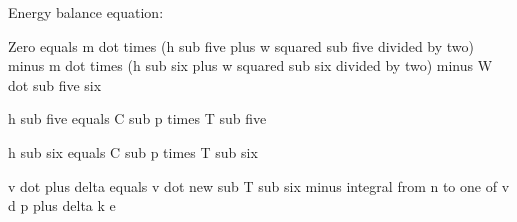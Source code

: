 Energy balance equation:

Zero equals m dot times (h sub five plus w squared sub five divided by two) minus m dot times (h sub six plus w squared sub six divided by two) minus W dot sub five six

h sub five equals C sub p times T sub five

h sub six equals C sub p times T sub six

v dot plus delta equals v dot new sub T sub six minus integral from n to one of v d p plus delta k e